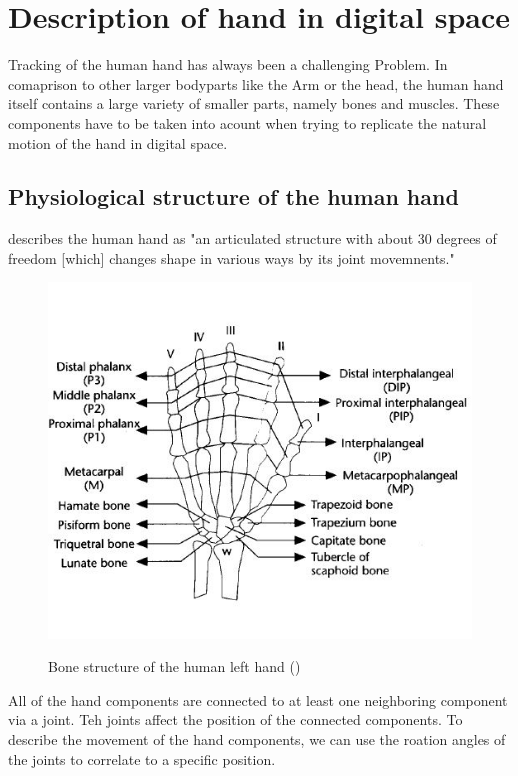 

\chapter{Description of hand in digital space}
Tracking of the human hand has always been a challenging Problem. In comaprison to other larger bodyparts like the Arm or the head, the human hand itself contains a large variety of smaller parts, namely bones and muscles. These components have to be taken into acount when trying to replicate the natural motion of the hand in digital space.\\
\section{Physiological structure of the human hand}
\citep{LEE.1995} describes the human hand as "an articulated structure with about 30 degrees of freedom [which] changes shape in various ways by its joint movemnents."
\begin{figure}[H]
	\includegraphics[scale=0.8]{images/hand.jpg}
	\label{Handstructure} 
	\caption{Bone structure of the human left hand (\cite{LEE.1995})}
\end{figure}
All of the hand components are connected to at least one neighboring component via a joint. Teh joints affect the position of the connected components. To describe the movement of the hand components, we can use the roation angles of the joints to correlate to a specific position.\\

